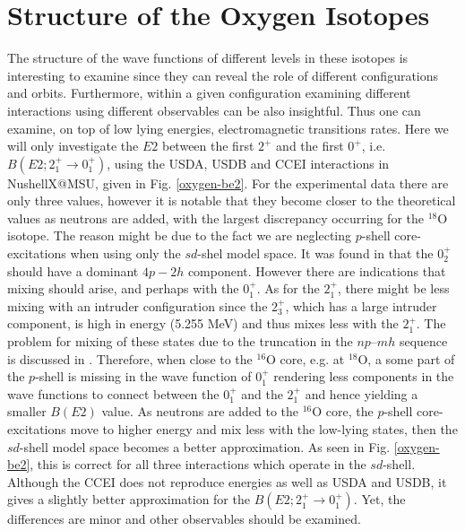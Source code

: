 \documentclass[aps,prl,reprint,groupedaddress]{revtex4-1}  %
\begin{document}
\section{Structure of the Oxygen Isotopes}
The structure of the wave functions of different levels in these isotopes is interesting to examine since they can reveal the role of different configurations and orbits. Furthermore, within a given configuration examining different interactions using different observables can be also insightful. Thus one can examine, on top of low lying energies, electromagnetic transitions rates. Here we will only investigate the $E2$ between the first $2^+$ and the first $0^+$, i.e. $B(E2; 2_1^+ \rightarrow 0_1^+)$, using the USDA, USDB and CCEI interactions in NushellX@MSU, given in Fig. \ref{oxygen-be2}. For the experimental data there are only three values, however it is notable that they become closer to the theoretical values as neutrons are added, with the largest discrepancy occurring for the $^{18}$O isotope. The reason might be due to the fact we are neglecting $p$-shell core-excitations when using only the $sd$-shel model space. It was found in \cite{Lawson1976} that the $0_2^+$ should have a dominant $4p-2h$ component. However there are indications that mixing should arise, and perhaps with the $0_1^+$. As for the $2^+_1$, there might be less mixing with an intruder configuration since the $2^+_3$, which has a large intruder component, is high in energy (5.255 MeV) 	 and thus mixes less with the $2^+_1$. The problem for mixing of these states due to the truncation in the $np–mh$ sequence is discussed in \cite{Warburton1992a}. Therefore, when close to the $^{16}$O core, e.g. at $^{18}$O, a some part of the $p$-shell is missing in the wave function of $0^+_1$ rendering less components in the wave functions to connect between the $0_1^+$ and the $2_1^+$ and hence yielding a smaller $B(E2)$ value. As neutrons are added to the $^{16} $O core, the $p$-shell core-excitations move to higher energy and mix less with the low-lying states, then the $sd$-shell model space becomes a better approximation. As seen in Fig. \ref{oxygen-be2}, this is correct for all three interactions which operate in the $sd$-shell. Although the CCEI does not reproduce energies as well as USDA and USDB, it gives a slightly better approximation for the $B(E2; 2_1^+ \rightarrow 0_1^+)$. Yet, the differences are minor and other observables should be examined.
\end{document}
